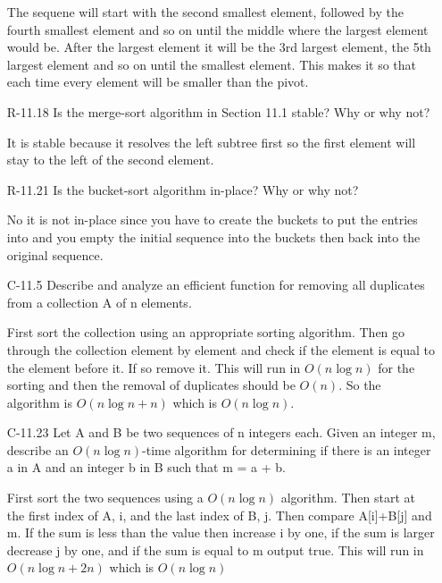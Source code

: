 \begin{itemize}
          \answer The sequene will start with the second smallest element, followed by the fourth smallest
          element and so on until the middle where the largest element would be. After the largest element it
          will be the 3rd largest element, the 5th largest element and so on until the smallest element. This
          makes it so that each time every element will be smaller than the pivot.

    \item[R-11.18] Is the merge-sort algorithm in Section 11.1 stable? Why or why not?
    
    \answer It is stable because it resolves the left subtree first so the first element will stay to the left of the 
    second element.

    \item[R-11.21] Is the bucket-sort algorithm in-place? Why or why not?

    \answer No it is not in-place since you have to create the buckets to put the entries into and 
    you empty the initial sequence into the buckets then back into the original sequence.

     \item[C-11.5] Describe and analyze an efficient function for removing all duplicates
from a collection A of n elements.

\answer First sort the collection using an appropriate sorting algorithm. Then go through the collection 
element by element and check if the element is equal to the element before it. If so remove it. This
will run in $O(n\log n)$ for the sorting and then the removal of duplicates should be $O(n)$. So 
the algorithm is $O(n\log n + n)$ which is $O(n\log n)$.

\item[C-11.23] Let A and B be two sequences of n integers each. Given an integer m,
describe an $O(n \log n)$-time algorithm for determining if there is an integer
a in A and an integer b in B such that m = a + b.

\answer First sort the two sequences using a $O(n\log n)$ algorithm. Then start at the 
first index of A, i, and the last index of B, j. Then compare A[i]+B[j] and m. If the sum 
is less than the value then increase i by one, if the sum is larger decrease j by one, and if 
the sum is equal to m output true. This will run in $O(n\log n + 2n)$ which is $O(n\log n)$ 






\end{itemize}

